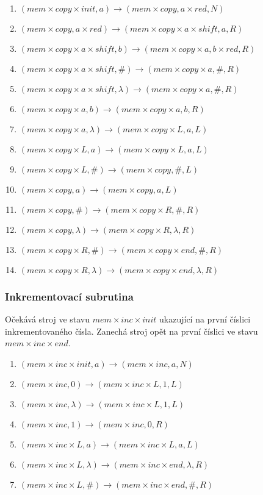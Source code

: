\documentclass[a4paper,12pt]{article} %
\begin{document}
\begin{enumerate}
    \item $(mem \times copy \times init, a) \to (mem \times copy, a \times red, N)$
    \item $(mem \times copy, a \times red) \to (mem \times copy \times a \times shift, a, R)$
    \item $(mem \times copy \times a \times shift, b) \to (mem \times copy \times a, b \times red, R)$
    \item $(mem \times copy \times a \times shift, \#) \to (mem \times copy \times a, \#, R)$
    \item $(mem \times copy \times a \times shift, \lambda) \to (mem \times copy \times a, \#, R)$
    \item $(mem \times copy \times a, b) \to (mem \times copy \times a, b, R)$
    \item $(mem \times copy \times a, \lambda) \to (mem \times copy \times L, a, L)$
    \item $(mem \times copy \times L, a) \to (mem \times copy \times L, a, L)$
    \item $(mem \times copy \times L, \#) \to (mem \times copy, \#, L)$
    \item $(mem \times copy, a) \to (mem \times copy, a, L)$
    \item $(mem \times copy, \#) \to (mem \times copy \times R, \#, R)$
    \item $(mem \times copy, \lambda) \to (mem \times copy \times R, \lambda, R)$
    \item $(mem \times copy \times R, \#) \to (mem \times copy \times end, \#, R)$
    \item $(mem \times copy \times R, \lambda) \to (mem \times copy \times end, \lambda, R)$
\end{enumerate}

\subsubsection*{Inkrementovací subrutina}

Očekává stroj ve stavu $mem \times inc \times init$ ukazující na první číslici inkrementovaného čísla. Zanechá stroj opět na první číslici ve stavu $mem \times inc \times end$.

\begin{enumerate}
    \item $(mem \times inc \times init, a) \to (mem \times inc, a, N)$
    \item $(mem \times inc, 0) \to (mem \times inc \times L, 1, L)$
    \item $(mem \times inc, \lambda) \to (mem \times inc \times L, 1, L)$
    \item $(mem \times inc, 1) \to (mem \times inc, 0, R)$
    \item $(mem \times inc \times L, a) \to (mem \times inc \times L, a, L)$
    \item $(mem \times inc \times L, \lambda) \to (mem \times inc \times end, \lambda, R)$
    \item $(mem \times inc \times L, \#) \to (mem \times inc \times end, \#, R)$
\end{enumerate}
\end{document}

